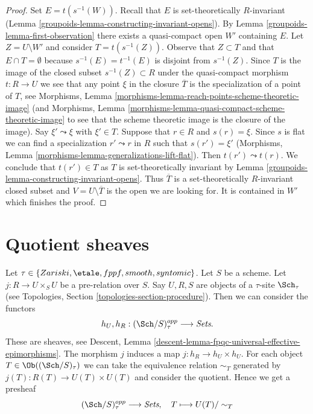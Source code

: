 \begin{proof}

Set $E = t(s^{-1}(W))$. Recall that $E$ is set-theoretically $R$-invariant
(Lemma \ref{groupoids-lemma-constructing-invariant-opens}).
By Lemma \ref{groupoids-lemma-first-observation} there exists a quasi-compact
open $W'$ containing $E$. Let $Z = U \setminus W'$ and consider
$T = t(s^{-1}(Z))$. Observe that $Z \subset T$ and that
$E \cap T = \emptyset$ because $s^{-1}(E) = t^{-1}(E)$ is disjoint
from $s^{-1}(Z)$. Since $T$ is the image of the closed subset
$s^{-1}(Z) \subset R$ under the quasi-compact morphism $t : R \to U$
we see that any point $\xi$ in the closure $\overline{T}$
is the specialization of a point of $T$, see
Morphisms, Lemma \ref{morphisms-lemma-reach-points-scheme-theoretic-image} (and
Morphisms, Lemma \ref{morphisms-lemma-quasi-compact-scheme-theoretic-image}
to see that the scheme theoretic image is the closure of the image).
Say $\xi' \leadsto \xi$ with $\xi' \in T$. Suppose that $r \in R$ and
$s(r) = \xi$. Since $s$ is flat we can find a specialization $r' \leadsto r$
in $R$ such that $s(r') = \xi'$
(Morphisms, Lemma \ref{morphisms-lemma-generalizations-lift-flat}).
Then $t(r') \leadsto t(r)$. We conclude that $t(r') \in T$ as $T$
is set-theoretically invariant by
Lemma \ref{groupoids-lemma-constructing-invariant-opens}.
Thus $\overline{T}$ is a set-theoretically $R$-invariant closed subset
and $V = U \setminus \overline{T}$ is the open we are
looking for. It is contained in $W'$ which finishes the proof.
\end{proof}

\section{Quotient sheaves}
\label{groupoids-section-quotient-sheaves}
Let $\tau \in \{Zariski, \etale, fppf, smooth, syntomic\}$.
Let $S$ be a scheme.
Let $j : R \to U \times_S U$ be a pre-relation over $S$.
Say $U, R, S$ are objects of a $\tau$-site $\Sch_\tau$
(see Topologies, Section \ref{topologies-section-procedure}).
Then we can consider the functors
$$
h_U, h_R :
(\Sch/S)_\tau^{opp}
\longrightarrow
\textit{Sets}.
$$
These are sheaves, see
Descent, Lemma \ref{descent-lemma-fpqc-universal-effective-epimorphisms}.
The morphism $j$ induces a map $j : h_R \to h_U \times h_U$.
For each object $T \in \Ob((\Sch/S)_\tau)$
we can take the equivalence relation $\sim_T$ generated by
$j(T) : R(T) \to U(T) \times U(T)$ and consider the quotient.
Hence we get a presheaf
\begin{equation}
\label{equation-quotient-presheaf}
(\Sch/S)_\tau^{opp}
\longrightarrow
\textit{Sets}, \quad
T \longmapsto U(T)/\sim_T
\end{equation}

